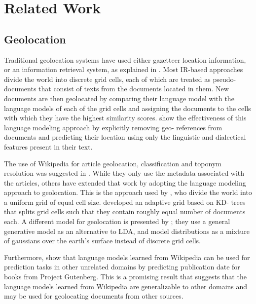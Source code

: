 \section{Related Work} 

\subsection{Geolocation}   

Traditional geolocation systems have used either
gazetteer location information, or an information retrieval system, as
explained in \cite{skiles:12}. Most IR-based approaches divide the world into
discrete grid cells, each of which are treated as pseudo-documents that
consist of texts from the documents located in them. New documents are then
geolocated by comparing their language model with the language models of each
of the grid cells and assigning the documents to the cells with which they
have the highest similarity scores. \cite{eisenstein- smith-xing:11} show the
effectiveness of this language modeling approach by explicitly removing geo-
references from documents and predicting their location using only the
linguistic and dialectical features present in their text.

\par The use of Wikipedia for article geolocation, classification and toponym
resolution was suggested in \cite{overell2009geographic}. While they only use
the metadata associated with the articles, others have extended that work by
adopting the language modeling approach to geolocation.  This is the approach
used by \cite{wing-baldridge:11}, who divide the world into a uniform grid of
equal cell size. \cite{rolleretal:12} developed an adaptive grid based on KD-
trees that splits grid cells such that they contain roughly equal number of
documents each. A different model for geolocation is presented by
\cite{eisensteinetal:11}; they use a general generative model as an
alternative to LDA, and model distributions as a mixture of gaussians over the
earth's surface instead of discrete grid cells.

\par Furthermore, \cite{kumar-et-al:11} show that language models learned from
Wikipedia can be used for prediction tasks in other unrelated domains by
predicting publication date for books from Project Gutenberg. This is a
promising result that suggests that the language models learned from Wikipedia
are generalizable to other domains and may be used for geolocating documents
from other sources.


